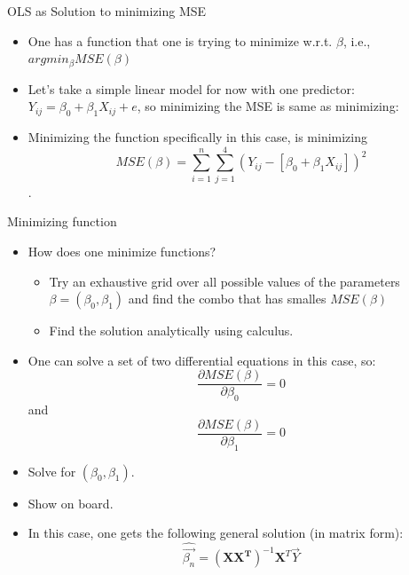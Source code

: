 \documentclass[ignorenonframetext,]{beamer}
\providecommand{\tightlist}{%
  \setlength{\itemsep}{0pt}\setlength{\parskip}{0pt}}
\begin{document}
\begin{frame}{OLS as Solution to minimizing MSE}

\begin{itemize}
\tightlist
\item
  One has a function that one is trying to minimize w.r.t. \(\beta\),
  i.e., \(argmin_{\beta} MSE(\beta)\)
\item
  Let's take a simple linear model for now with one predictor:
  \(Y_{ij} = \beta_0+\beta_1 X_{ij}+e\), so minimizing the MSE is same
  as minimizing:
\item
  Minimizing the function specifically in this case, is minimizing
  \[MSE(\beta) = \sum_{i=1}^n \sum_{j=1}^4(Y_{ij}-[\beta_0 +\beta_1 X_{ij}]) ^2 \].
\end{itemize}

\end{frame}

\begin{frame}{Minimizing function}

\begin{itemize}
\tightlist
\item
  How does one minimize functions?

  \begin{itemize}
  \tightlist
  \item
    Try an exhaustive grid over all possible values of the parameters
    \(\beta=(\beta_0,\beta_1)\) and find the combo that has smalles
    \(MSE(\beta)\)
  \item
    Find the solution analytically using calculus.
  \end{itemize}
\item
  One can solve a set of two differential equations in this case, so:
  \[ \frac{\partial MSE(\beta)}{\partial \beta_0} = 0 \] and
  \[ \frac{\partial MSE(\beta)}{\partial \beta_1} = 0 \]
\item
  Solve for \((\beta_0, \beta_1)\).
\item
  Show on board.
\item
  In this case, one gets the following general solution (in matrix
  form):
  \[\hat{\vec{\beta_n}} = \boldsymbol{(X X^T) }^{-1} \boldsymbol{X}^T \vec{Y}\]
\end{itemize}

\end{frame}
\end{document}
